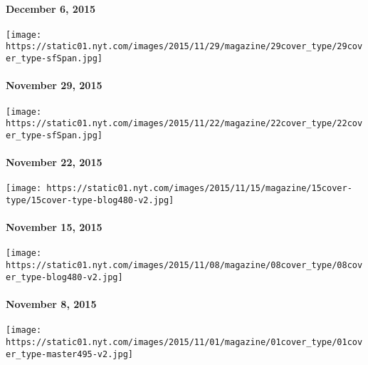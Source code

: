 \hypertarget{december-6-2015}{%
\paragraph{December 6, 2015}\label{december-6-2015}}

\href{http://www.nytimes.com/indexes/2015/11/29/magazine/index.html}{}

\texttt{[image: https://static01.nyt.com/images/2015/11/29/magazine/29cover\_type/29cover\_type-sfSpan.jpg]}

\hypertarget{november-29-2015}{%
\paragraph{November 29, 2015}\label{november-29-2015}}

\href{http://www.nytimes.com/indexes/2015/11/22/magazine/index.html}{}

\texttt{[image: https://static01.nyt.com/images/2015/11/22/magazine/22cover\_type/22cover\_type-sfSpan.jpg]}

\hypertarget{november-22-2015}{%
\paragraph{November 22, 2015}\label{november-22-2015}}

\href{http://www.nytimes.com/indexes/2015/11/15/magazine/index.html}{}

\texttt{[image: https://static01.nyt.com/images/2015/11/15/magazine/15cover-type/15cover-type-blog480-v2.jpg]}

\hypertarget{november-15-2015}{%
\paragraph{November 15, 2015}\label{november-15-2015}}

\href{http://www.nytimes.com/indexes/2015/11/08/magazine/index.html}{}

\texttt{[image: https://static01.nyt.com/images/2015/11/08/magazine/08cover\_type/08cover\_type-blog480-v2.jpg]}

\hypertarget{november-8-2015}{%
\paragraph{November 8, 2015}\label{november-8-2015}}

\href{http://www.nytimes.com/indexes/2015/11/01/magazine/index.html}{}

\texttt{[image: https://static01.nyt.com/images/2015/11/01/magazine/01cover\_type/01cover\_type-master495-v2.jpg]}

